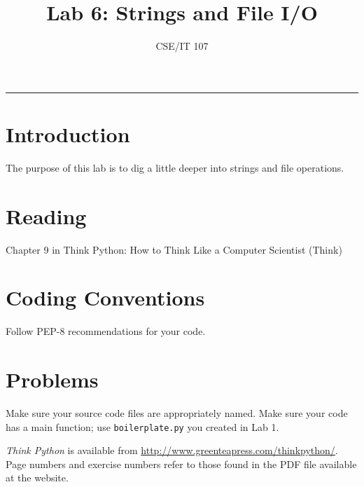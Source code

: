 \documentclass[12pt]{article}
\title{Lab 6: Strings and File I/O}
\author{CSE/IT 107}
\date{}
\begin{document}
\maketitle


\hrule
\section*{Introduction}

The purpose of this lab is to dig a little deeper into strings and file operations.

\section*{Reading}

Chapter 9 in Think Python: How to Think Like a Computer Scientist (Think)

\section*{Coding Conventions}

Follow PEP-8 recommendations for your code. 

\section*{Problems}

    
  Make sure your source code files are appropriately named. Make sure your code has a main function; use \texttt{boilerplate.py} you created in Lab 1.

\emph{Think Python} is available from \url{http://www.greenteapress.com/thinkpython/}. Page numbers and exercise numbers refer to those found in the PDF file available at the website.
\end{document}
